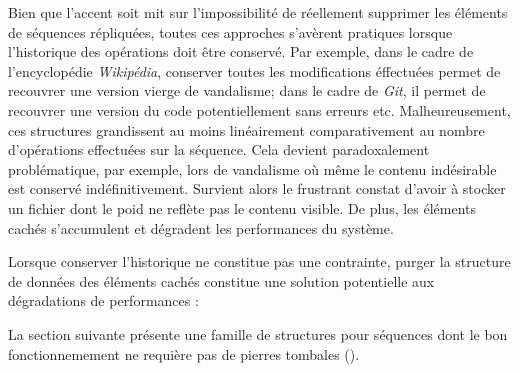 Bien que l'accent soit mit sur l'impossibilité de réellement supprimer les
éléments de séquences répliquées, toutes ces approches s'avèrent pratiques
lorsque l'historique des opérations doit être conservé. Par exemple, dans le
cadre de l'encyclopédie \emph{Wikipédia}, conserver toutes les modifications
éffectuées permet de recouvrer une version vierge de vandalisme; dans le cadre
de \emph{Git}, il permet de recouvrer une version du code potentiellement sans
erreurs etc. Malheureusement, ces structures grandissent au moins linéairement
comparativement au nombre d'opérations effectuées sur la séquence. Cela devient
paradoxalement problématique, par exemple, lors de vandalisme où même le contenu
indésirable est conservé indéfinitivement. Survient alors le frustrant constat
d'avoir à stocker un fichier dont le poid ne reflète pas le contenu visible. De
plus, les éléments cachés s'accumulent et dégradent  les
performances du système.

Lorsque conserver l'historique ne constitue pas une contrainte, purger la
structure de données des éléments cachés constitue une solution potentielle aux
dégradations de performances :


La section suivante présente une famille de structures pour séquences dont le
bon fonctionnemement ne requière pas de pierres tombales ().

